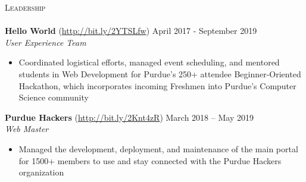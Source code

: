 \documentclass[letterpaper, 10pt]{article}
\newcommand{\lineunder} {
    \vspace*{-8pt} \\
    \hspace*{-18pt} \hrulefill \\
}
\newcommand{\header} [1] {
    {
        \hspace*{-18pt}\vspace*{6pt}
        {\large\textsc{#1}}
    }
    \vspace*{-6pt} \lineunder
}
\begin{document}
\header{Leadership}

{\textbf{Hello World}} (\href{http://bit.ly/2YTSLfw}{http://bit.ly/2YTSLfw}) \hfill April 2017 - September 2019\\
\textit{User Experience Team}\\
\vspace{-1mm}
\begin{itemize} \itemsep 1pt
	\item Coordinated logistical efforts, managed event scheduling, and mentored students in Web Development for Purdue’s 250+ attendee Beginner-Oriented Hackathon, which incorporates incoming Freshmen into Purdue’s Computer Science community
\end{itemize}

\textbf{Purdue Hackers} (\href{http://bit.ly/2Knt4zR}{http://bit.ly/2Knt4zR})
\hfill March 2018 -- May 2019\\
\textit{Web Master}\\
\vspace{-1mm}
\begin{itemize} \itemsep 1pt
	\item Managed the development, deployment, and maintenance of the main portal for 1500+ members to use and stay connected with the Purdue Hackers organization
\end{itemize}

\vspace*{2mm}

\
\end{document}
